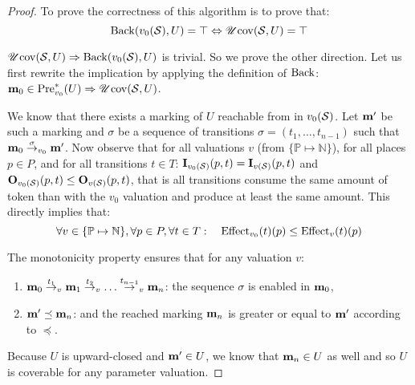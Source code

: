 \begin{proof}
  To prove the correctness of this algorithm is to prove that:
  \[
    \operatorname{Back}(v_0(\mathcal{S}), U) = \top \Leftrightarrow \operatorname{\mathscr{U}cov}(\mathcal{S}, U) = \top
  \]

$\operatorname{\mathscr{U}cov}(\mathcal{S}, U) \Rightarrow \operatorname{Back}(v_0(\mathcal{S}), U)$ is trivial. So we prove the other direction. Let us first rewrite the implication by applying the definition of $\operatorname{Back}$: $\mathbf{m}_0 \in \operatorname{Pre}_{v_0}^*(U) \Rightarrow \operatorname{\mathscr{U}cov}(\mathcal{S}, U)$.


  We know that there exists a marking of $U$ reachable from \mari in $v_0(\mathcal{S})$.
  Let $\mathbf{m'}$ be such a marking and $\sigma$ be a sequence of transitions $\sigma = (t_1, \dots, t_{n-1})$ such that $\mathbf{m}_0 \stackrel{\sigma}{\to}_{v_0} \mathbf{m'}$.
  Now observe that for all valuations $v$ (from $\{\mathbb{P} \mapsto \mathbb{N}\}$), for all places $p \in P$, and for all transitions $t \in T$: $\mathbf{I}_{v_0(\mathcal{S})}(p,t) = \mathbf{I}_{v(\mathcal{S})}(p,t)$ and $\mathbf{O}_{v_0(\mathcal{S})}(p,t) \leq \mathbf{O}_{v(\mathcal{S})}(p,t)$, that is all transitions consume the same amount of token than with the $v_0$ valuation and produce at least the same amount. This directly implies that: 
  \[
    \forall v \in \{\mathbb{P} \mapsto \mathbb{N}\}, \forall p \in P, \forall t \in T :
  \quad
  \operatorname{Effect}_{v_0}(t)(p) \leq \operatorname{Effect}_v(t)(p)
  \]

The monotonicity property ensures that for any valuation $v$:
  \begin{enumerate}
    \item $\mathbf{m}_0 \stackrel{t_1}{\to}_v \mathbf{m}_1 \stackrel{t_2}{\to}_v \dots \stackrel{t_{n-1}}{\to}_v \mathbf{m}_n$: the sequence $\sigma$ is enabled  in $\mathbf{m}_0$,
    \item $\mathbf{m'} \preceq \mathbf{m}_n$: and the reached marking $\mathbf{m}_n$ is greater or equal to $\mathbf{m'}$ according to $\preceq$.
  \end{enumerate}

  Because $U$ is upward-closed and $\mathbf{m'} \in U$, we know that $\mathbf{m}_n \in U$ as well and so $U$ is coverable for any parameter valuation.
\end{proof}

